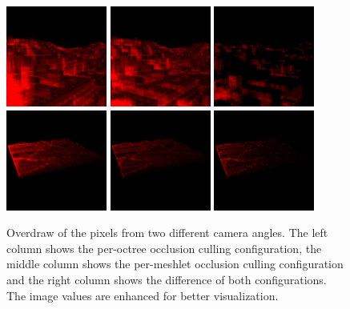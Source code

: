 \begin{figure}[!htb]
  \centering
  \includegraphics[height=125px]{images/graphics/overdraw-terrain1-pooc.png}
  \includegraphics[height=125px]{images/graphics/overdraw-terrain1-pmoc.png}
  \includegraphics[height=125px]{images/graphics/overdraw-terrain1-diff.png}
  \includegraphics[height=125px]{images/graphics/overdraw-terrain2-pooc.png}
  \includegraphics[height=125px]{images/graphics/overdraw-terrain2-pmoc.png}
  \includegraphics[height=125px]{images/graphics/overdraw-terrain2-diff.png}
  \caption{Overdraw of the pixels from two different camera angles. The left column 
  shows the per-octree occlusion culling configuration, the middle column shows the 
  per-meshlet occlusion culling configuration and the right column shows the difference 
  of both configurations. The image values are enhanced for better visualization.}
  \label{fig:terrain-overdraw}
\end{figure}


